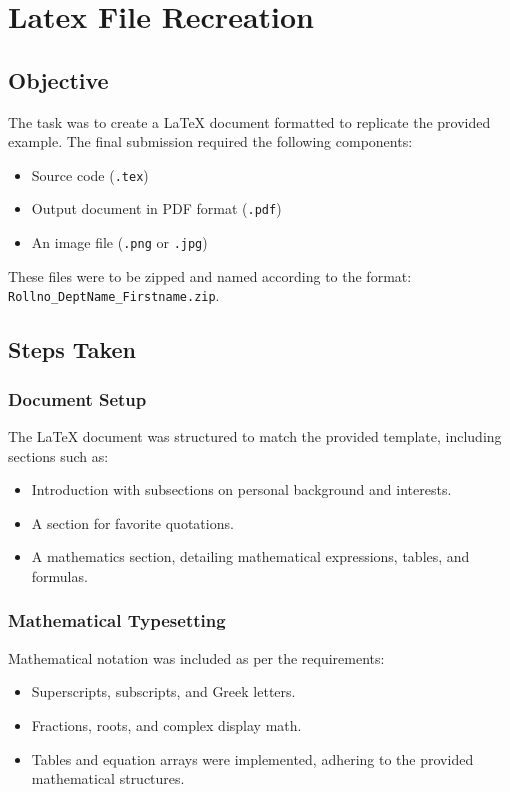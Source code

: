 \section{Latex File Recreation}

\subsection{Objective}
The task was to create a LaTeX document formatted to replicate the provided example. The final submission required the following components:
\begin{itemize}
    \item Source code (\texttt{.tex})
    \item Output document in PDF format (\texttt{.pdf})
    \item An image file (\texttt{.png} or \texttt{.jpg})
\end{itemize}
These files were to be zipped and named according to the format: \texttt{Rollno\_DeptName\_Firstname.zip}.

\subsection{Steps Taken}

\subsubsection{Document Setup}
The LaTeX document was structured to match the provided template, including sections such as:
\begin{itemize}
    \item Introduction with subsections on personal background and interests.
    \item A section for favorite quotations.
    \item A mathematics section, detailing mathematical expressions, tables, and formulas.
\end{itemize}

\subsubsection{Mathematical Typesetting}
Mathematical notation was included as per the requirements:
\begin{itemize}
    \item Superscripts, subscripts, and Greek letters.
    \item Fractions, roots, and complex display math.
    \item Tables and equation arrays were implemented, adhering to the provided mathematical structures.
\end{itemize}

